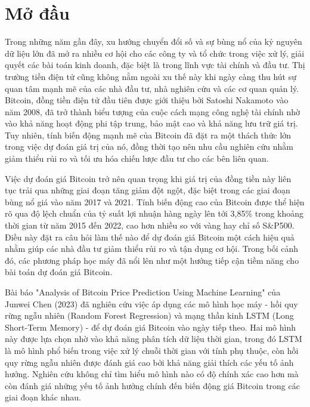 \chapter*{Mở đầu}

Trong những năm gần đây, xu hướng chuyển đổi số và sự bùng nổ của kỷ nguyên dữ liệu lớn đã mở ra nhiều cơ hội cho các công ty và tổ chức trong việc xử lý, giải quyết các bài toán kinh doanh, đặc biệt là trong lĩnh vực tài chính và đầu tư. Thị trường tiền điện tử cũng không nằm ngoài xu thế này khi ngày càng thu hút sự quan tâm mạnh mẽ của các nhà đầu tư, nhà nghiên cứu và các cơ quan quản lý. Bitcoin, đồng tiền điện tử đầu tiên được giới thiệu bởi Satoshi Nakamoto vào năm 2008, đã trở thành biểu tượng của cuộc cách mạng công nghệ tài chính nhờ vào khả năng hoạt động phi tập trung, bảo mật cao và khả năng lưu trữ giá trị. Tuy nhiên, tính biến động mạnh mẽ của Bitcoin đã đặt ra một thách thức lớn trong việc dự đoán giá trị của nó, đồng thời tạo nên nhu cầu nghiên cứu nhằm giảm thiểu rủi ro và tối ưu hóa chiến lược đầu tư cho các bên liên quan.

Việc dự đoán giá Bitcoin trở nên quan trọng khi giá trị của đồng tiền này liên tục trải qua những giai đoạn tăng giảm đột ngột, đặc biệt trong các giai đoạn bùng nổ giá vào năm 2017 và 2021. Tính biến động cao của Bitcoin được thể hiện rõ qua độ lệch chuẩn của tỷ suất lợi nhuận hàng ngày lên tới 3,85\% 
trong khoảng thời gian từ năm 2015 đến 2022, cao hơn nhiều so với vàng hay chỉ số S\&P500. Điều này đặt ra câu hỏi làm thế nào để dự đoán giá Bitcoin một cách hiệu quả nhằm giúp các nhà đầu tư giảm thiểu rủi ro và tận dụng cơ hội. Trong bối cảnh đó, các phương pháp học máy đã nổi lên như một hướng tiếp cận tiềm năng cho bài toán dự đoán giá Bitcoin.

Bài báo "Analysis of Bitcoin Price Prediction Using Machine Learning" của Junwei Chen (2023) đã nghiên cứu việc áp dụng các mô hình học máy - hồi quy rừng ngẫu nhiên (Random Forest Regression) và mạng thần kinh LSTM (Long Short-Term Memory) - để dự đoán giá Bitcoin vào ngày tiếp theo. Hai mô hình này được lựa chọn nhờ vào khả năng phân tích dữ liệu thời gian, trong đó LSTM là mô hình phổ biến trong việc xử lý chuỗi thời gian với tính phụ thuộc, còn hồi quy rừng ngẫu nhiên được đánh giá cao bởi khả năng giải thích các yếu tố ảnh hưởng. Nghiên cứu không chỉ tìm hiểu mô hình nào có độ chính xác cao hơn mà còn đánh giá những yếu tố ảnh hưởng chính đến biến động giá Bitcoin trong các giai đoạn khác nhau.

